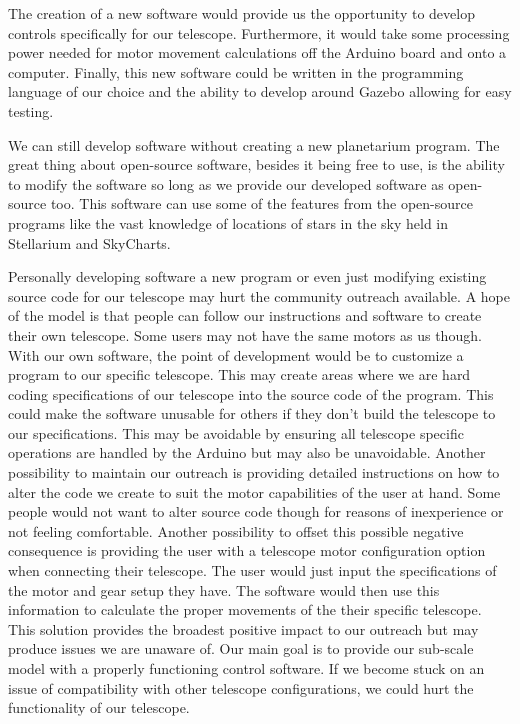\documentclass[12pt]{report}
\begin{document}
The creation of a new software would provide us the opportunity to develop controls specifically for our telescope. Furthermore, it would take some processing power needed for motor movement calculations off the Arduino board and onto a computer. Finally, this new software could be written in the programming language of our choice and the ability to develop around Gazebo allowing for easy testing.

We can still develop software without creating a new planetarium program. The great thing about open-source software, besides it being free to use, is the ability to modify the software so long as we provide our developed software as open-source too. This software can use some of the features from the open-source programs like the vast knowledge of locations of stars in the sky held in Stellarium and SkyCharts.

Personally developing software a new program or even just modifying existing source code for our telescope may hurt the community outreach available. A hope of the model is that people can follow our instructions and software to create their own telescope. Some users may not have the same motors as us though. With our own software, the point of development would be to customize a program to our specific telescope. This may create areas where we are hard coding specifications of our telescope into the source code of the program. This could make the software unusable for others if they don’t build the telescope to our specifications. This may be avoidable by ensuring all telescope specific operations are handled by the Arduino but may also be unavoidable. Another possibility to maintain our outreach is providing detailed instructions on how to alter the code we create to suit the motor capabilities of the user at hand. Some people would not want to alter source code though for reasons of inexperience or not feeling comfortable. Another possibility to offset this possible negative consequence is providing the user with a telescope motor configuration option when connecting their telescope. The user would just input the specifications of the motor and gear setup they have. The software would then use this information to calculate the proper movements of the their specific telescope. This solution provides the broadest positive impact to our outreach but may produce issues we are unaware of. Our main goal is to provide our sub-scale model with a properly functioning control software. If we become stuck on an issue of compatibility with other telescope configurations, we could hurt the functionality of our telescope.
\end{document}
